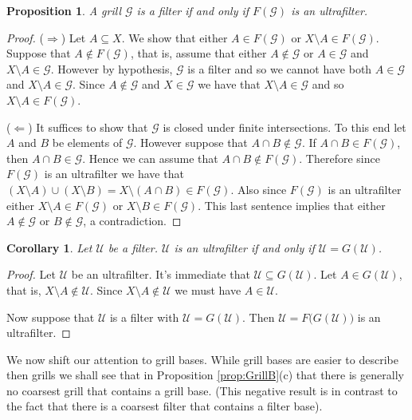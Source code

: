 \documentclass[12pt]{article}
\theoremstyle{plain}
\newtheorem{prop}[thm]{Proposition}
\newtheorem{cor}[thm]{Corollary}
\theoremstyle{definition}
\newcommand{\calG}{\mathcal{G}}
\newcommand{\calU}{\mathcal{U}}
\begin{document}
\begin{prop}
  A grill $\calG$ is a filter if and only if $F(\calG)$ is an ultrafilter.
\end{prop}
\begin{proof}
  ($\Rightarrow$)
  Let $A \subseteq X$.
  We show that either $A \in F(\calG)$ or $X \setminus A \in F(\calG)$.
  Suppose that $A \not\in F(\calG)$, that is, assume that either $A \not\in \calG$ or $A \in \calG$ and $X \setminus A \in \calG$.
  However by hypothesis, $\calG$ is a filter and so we cannot have both $A \in \calG$ and $X \setminus A \in \calG$.
  Since $A \not\in \calG$ and $X \in \calG$ we have that $X \setminus A \in \calG$ and so $X \setminus A \in F(\calG)$.

  ($\Leftarrow$)
  It suffices to show that $\calG$ is closed under finite intersections.
  To this end let $A$ and $B$ be elements of $\calG$.
  However suppose that $A \cap B \not\in \calG$.
  If $A \cap B \in F(\calG)$, then $A \cap B \in \calG$.
  Hence we can assume that $A \cap B \not\in F(\calG)$.
  Therefore since $F(\calG)$ is an ultrafilter we have that $(X \setminus A) \cup (X \setminus B) = X \setminus (A \cap B) \in F(\calG)$.
  Also since $F(\calG)$ is an ultrafilter either $X \setminus A \in F(\calG)$ or $X \setminus B \in F(\calG)$. 
  This last sentence implies that either $A \not\in \calG$ or $B \not\in \calG$, a contradiction.
\end{proof}
\begin{cor}
  Let $\calU$ be a filter.
  $\calU$ is an ultrafilter if and only if $\calU = G(\calU)$.
\end{cor}
\begin{proof}
  Let $\calU$ be an ultrafilter.
  It's immediate that $\calU \subseteq G(\calU)$.
  Let $A \in G(\calU)$, that is, $X \setminus A \not\in \calU$. 
  Since $X \setminus A \not\in \calU$ we must have $A \in \calU$.

  Now suppose that $\calU$ is a filter with $\calU = G(\calU)$.
  Then $\calU = F\bigl(G(\calU)\bigr)$ is an ultrafilter.
\end{proof}

We now shift our attention to grill bases.
While grill bases are easier to describe then grills we shall see that in Proposition \ref{prop:GrillB}(c) that there is generally no coarsest grill that contains a grill base.
(This negative result is in contrast to the fact that there is a coarsest filter that contains a filter base).
\end{document}
